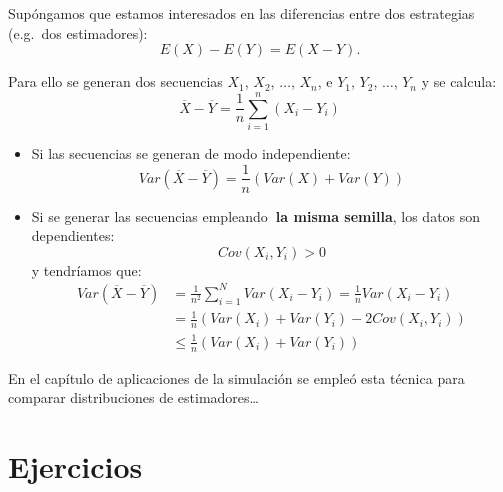 \documentclass[
  spanish,
  10pt,
]{book}
\theoremstyle{break}
\theoremstyle{nonumberplain}
\begin{document}
Supóngamos que estamos interesados en las diferencias entre dos
estrategias (e.g.~dos estimadores):
\[E\left(  X\right)  -E\left(  Y\right)  =E\left(  X-Y\right).\]

Para ello se generan dos secuencias \(X_{1}\), \(X_{2}\), \(\ldots\),
\(X_{n}\), e \(Y_{1}\), \(Y_{2}\), \(\ldots\), \(Y_{n}\) y se calcula:
\[\overline{X}-\overline{Y}=\frac{1}{n}\sum_{i=1}^{n}\left(  X_{i}-Y_{i}\right)\]

\begin{itemize}
\item
  Si las secuencias se generan de modo independiente:
  \[Var\left( \overline{X} - \overline{Y} \right) 
  = \frac{1}{n} \left( Var\left( X \right) + Var\left( Y \right) \right)\]
\item
  Si se generar las secuencias empleando\textbf{~la misma semilla},
  los datos son dependientes:
  \[Cov\left( X_{i}, Y_{i} \right) > 0\]
  y tendríamos que:
  \[\begin{aligned}
  Var\left( \overline{X}-\overline{Y}\right)  &
  = \frac{1}{n^{2}}\sum_{i=1}^{N}Var\left( X_{i}-Y_{i}\right) 
  = \frac{1}{n}Var\left( X_{i}-Y_{i}\right) \\
  & = \frac{1}{n}\left( Var\left( X_{i} \right) + Var\left( Y_{i} \right)
  - 2Cov\left( X_{i},Y_{i} \right) \right) \\
  & \leq \frac{1}{n}\left( Var\left( X_{i} \right) 
  + Var\left( Y_{i}\right) \right)
  \end{aligned}\]
\end{itemize}

En el capítulo de aplicaciones de la simulación se empleó esta técnica para comparar distribuciones de estimadores\ldots{}

\section{Ejercicios}\label{ejercicios-2}
\end{document}
